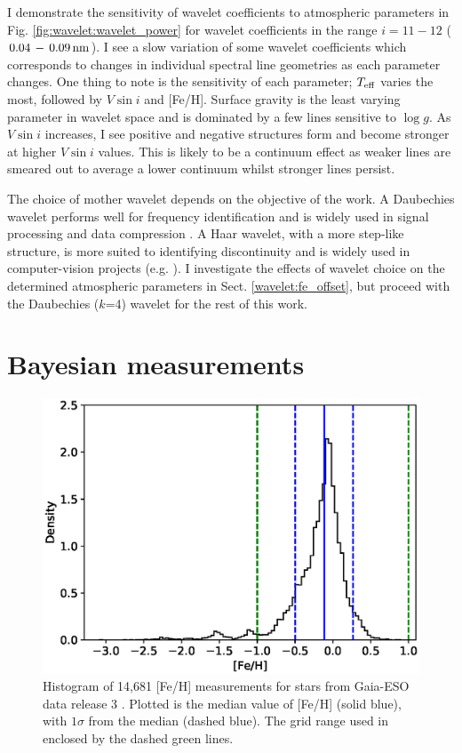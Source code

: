 I demonstrate the sensitivity of wavelet coefficients to atmospheric parameters in Fig. \ref{fig:wavelet:wavelet_power} for wavelet coefficients in the range $i=11-12$ ($0.04\,-\,0.09\, \rm nm$). I see a slow variation of some wavelet coefficients which corresponds to changes in individual spectral line geometries as each parameter changes.  One thing to note is the sensitivity of each parameter; $T_{\rm eff}$ varies the most, followed by $V \sin i$ and [Fe/H]. Surface gravity is the least varying parameter in wavelet space and is dominated by a few lines sensitive to $\log g$. As $V \sin i$ increases, I see positive and negative structures form and become stronger at higher $V \sin i$ values. This is likely to be a continuum effect as weaker lines are smeared out to average a lower continuum whilst stronger lines persist.

The choice of mother wavelet depends on the objective of the work.  A Daubechies wavelet performs well for frequency identification and is widely used in signal processing and data compression \citep{2002A26A...386.1143B}. A Haar wavelet, with a more step-like structure, is more suited to identifying discontinuity and is widely used in computer-vision projects (e.g. \citealt{2009arXiv0911.0399E}). I investigate the effects of wavelet choice on the determined atmospheric parameters in Sect. \ref{wavelet:fe_offset}, but proceed with the Daubechies ($k$=4) wavelet for the rest of this work. 


\section{Bayesian measurements} \label{wavelet:Method}


\begin{figure}[ht!]
\centering
\includegraphics[scale=1]{5-images/FEH_FGK_stars.eps}
\caption{Histogram of 14,681 [Fe/H] measurements for  stars from Gaia-ESO data release 3 \protect\citep{2014A&A...570A.122S}. Plotted is the median value of [Fe/H] (solid blue), with $1 \sigma$ from the median (dashed blue). The grid range used in enclosed by the dashed green lines.}
\label{wavelet:fig:FE_H}
\end{figure}

